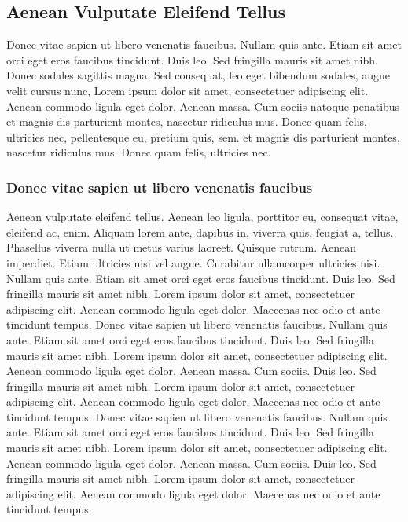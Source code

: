 \subsection{Aenean Vulputate Eleifend Tellus}

Donec vitae sapien ut libero venenatis faucibus. Nullam quis ante. Etiam sit amet orci eget eros faucibus tincidunt. Duis leo. Sed fringilla mauris sit amet nibh. Donec sodales sagittis magna. Sed consequat, leo eget bibendum sodales, augue velit cursus nunc, Lorem ipsum dolor sit amet, consectetuer adipiscing elit. Aenean commodo ligula eget dolor. Aenean massa. Cum sociis natoque penatibus et magnis dis parturient montes, nascetur ridiculus mus. Donec quam felis, ultricies nec, pellentesque eu, pretium quis, sem. et magnis dis parturient montes, nascetur ridiculus mus. Donec quam felis, ultricies nec.

\subsubsection{Donec vitae sapien ut libero venenatis faucibus}

Aenean vulputate eleifend tellus. Aenean leo ligula, porttitor eu, consequat vitae, eleifend ac, enim. Aliquam lorem ante, dapibus in, viverra quis, feugiat a, tellus. Phasellus viverra nulla ut metus varius laoreet. Quisque rutrum. Aenean imperdiet. Etiam ultricies nisi vel augue. Curabitur ullamcorper ultricies nisi. Nullam quis ante. Etiam sit amet orci eget eros faucibus tincidunt. Duis leo. Sed fringilla mauris sit amet nibh. Lorem ipsum dolor sit amet, consectetuer adipiscing elit. Aenean commodo ligula eget dolor. Maecenas nec odio et ante tincidunt tempus. Donec vitae sapien ut libero venenatis faucibus. Nullam quis ante. Etiam sit amet orci eget eros faucibus tincidunt. Duis leo. Sed fringilla mauris sit amet nibh. Lorem ipsum dolor sit amet, consectetuer adipiscing elit. Aenean commodo ligula eget dolor. Aenean massa. Cum sociis. Duis leo. Sed fringilla mauris sit amet nibh. Lorem ipsum dolor sit amet, consectetuer adipiscing elit. Aenean commodo ligula eget dolor. Maecenas nec odio et ante tincidunt tempus. Donec vitae sapien ut libero venenatis faucibus. Nullam quis ante. Etiam sit amet orci eget eros faucibus tincidunt. Duis leo. Sed fringilla mauris sit amet nibh. Lorem ipsum dolor sit amet, consectetuer adipiscing elit. Aenean commodo ligula eget dolor. Aenean massa. Cum sociis. Duis leo. Sed fringilla mauris sit amet nibh. Lorem ipsum dolor sit amet, consectetuer adipiscing elit. Aenean commodo ligula eget dolor. Maecenas nec odio et ante tincidunt tempus.

